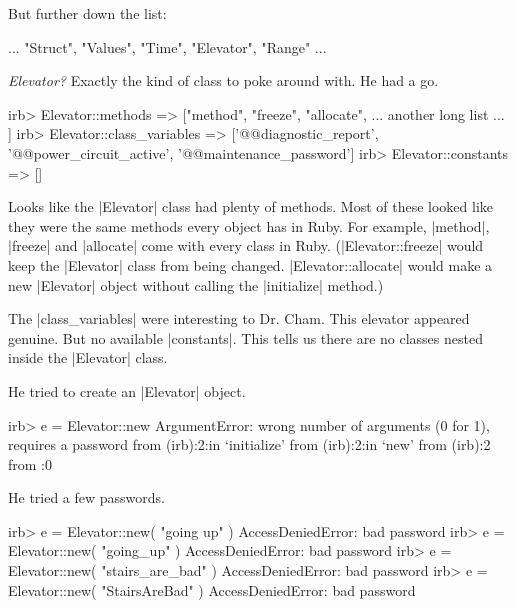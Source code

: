 \documentclass[12pt,twoside]{report}
\begin{document}
But further down the list:


\begin{consolecode}

 ... "Struct", "Values", "Time", "Elevator", "Range" ...

\end{consolecode}


{\em Elevator?}  Exactly the kind of class to poke around with.  He
had a go.


\begin{consolecode}

 irb> Elevator::methods
   => ["method", "freeze", "allocate", ... another long list ... ]
 irb> Elevator::class_variables
   => ['@@diagnostic_report', '@@power_circuit_active', '@@maintenance_password']
 irb> Elevator::constants
   => []

\end{consolecode}


Looks like the \rubyinline|Elevator| class had plenty
of methods.  Most of these looked like they were the same methods
every object has in Ruby.  For example,
\rubyinline|method|,
\rubyinline|freeze| and
\rubyinline|allocate| come with every class in Ruby.
(\rubyinline|Elevator::freeze| would keep the
\rubyinline|Elevator| class from being changed.
\rubyinline|Elevator::allocate| would make a new
\rubyinline|Elevator| object without calling the
\rubyinline|initialize| method.)

The \rubyinline|class_variables| were interesting to
Dr. Cham.  This elevator appeared genuine. But no available
\rubyinline|constants|.  This tells us there are no
classes nested inside the \rubyinline|Elevator| class.

He tried to create an \rubyinline|Elevator| object.


\begin{consolecode}

 irb> e = Elevator::new
 ArgumentError: wrong number of arguments (0 for 1), requires a password
         from (irb):2:in `initialize'
         from (irb):2:in `new'
         from (irb):2
         from :0

\end{consolecode}


He tried a few passwords.


\begin{consolecode}

 irb> e = Elevator::new( "going up" )
 AccessDeniedError: bad password
 irb> e = Elevator::new( "going_up" )
 AccessDeniedError: bad password
 irb> e = Elevator::new( "stairs_are_bad" )
 AccessDeniedError: bad password
 irb> e = Elevator::new( "StairsAreBad" )
 AccessDeniedError: bad password

\end{consolecode}
\end{document}
